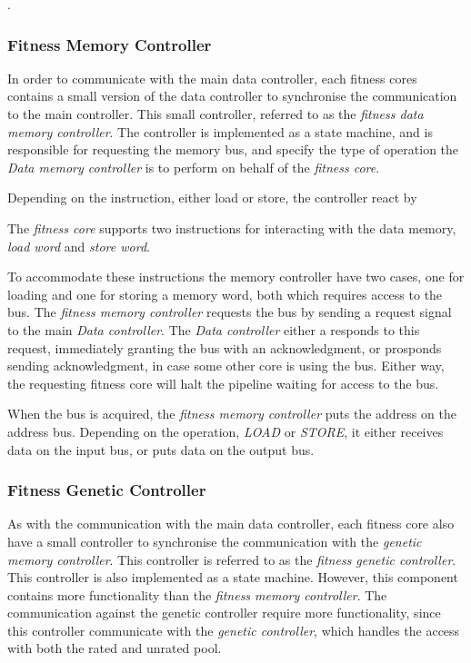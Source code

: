 .




\subsubsection{Fitness Memory Controller} 
In order to communicate with the main data controller, each fitness cores contains a small version of the data controller to synchronise the communication to the main controller. This small controller, referred to as the \emph{fitness data memory controller}. The controller is implemented as a state machine, and is responsible for requesting the memory bus, and specify the type of operation the \emph{Data memory controller} is to perform on behalf of the \emph{fitness core}.  





Depending on the instruction, either load or store, the controller react by 

The \emph{fitness core} supports two instructions for interacting with the data memory,  \emph{load word} and \emph{store word}. 







To accommodate these instructions the memory controller have two cases, one for loading and one for storing a memory word, both which requires access to the bus. The \emph{fitness memory controller} requests the bus by sending a request signal to the main \emph{Data controller}. The \emph{Data controller} either a responds to this request, immediately granting the bus with an acknowledgment, or prosponds sending acknowledgment, in case some other core is using the bus. Either way, the requesting fitness core will halt the pipeline waiting for access to the bus. 

When the bus is acquired, the \emph{fitness memory controller} puts the address on the address bus. Depending on the operation, \emph{LOAD} or \emph{STORE}, it either receives data on the input bus, or puts data on the output bus. 




\subsubsection{Fitness Genetic Controller} 
As with the communication with the main data controller, each fitness core also have a small controller to synchronise the communication with the \emph{genetic memory controller}. This controller is referred to as the \emph{fitness genetic controller}. This controller is also implemented as a state machine. However, this component contains more functionality than the \emph{fitness memory controller}. The communication against the genetic controller require more functionality, since this controller communicate with the \emph{genetic controller}, which handles the access with both the rated and unrated pool. 





